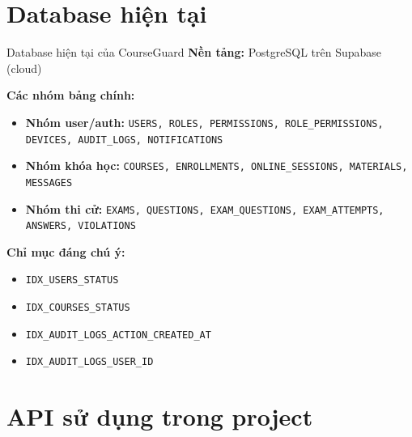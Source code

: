 \documentclass[aspectratio=169]{beamer}
\begin{document}
\section{Database hiện tại}

\begin{frame}{Database hiện tại của CourseGuard}
\textbf{Nền tảng:} PostgreSQL trên Supabase (cloud)

\vspace{0.5em}
\textbf{Các nhóm bảng chính:}
\begin{itemize}
  \item \textbf{Nhóm user/auth:} \texttt{USERS, ROLES, PERMISSIONS, ROLE\_PERMISSIONS, DEVICES, AUDIT\_LOGS, NOTIFICATIONS}
  \item \textbf{Nhóm khóa học:} \texttt{COURSES, ENROLLMENTS, ONLINE\_SESSIONS, MATERIALS, MESSAGES}
  \item \textbf{Nhóm thi cử:} \texttt{EXAMS, QUESTIONS, EXAM\_QUESTIONS, EXAM\_ATTEMPTS, ANSWERS, VIOLATIONS}
\end{itemize}

\vspace{0.5em}
\textbf{Chỉ mục đáng chú ý:}
\begin{itemize}
  \item \texttt{IDX\_USERS\_STATUS}
  \item \texttt{IDX\_COURSES\_STATUS}
  \item \texttt{IDX\_AUDIT\_LOGS\_ACTION\_CREATED\_AT}
  \item \texttt{IDX\_AUDIT\_LOGS\_USER\_ID}
\end{itemize}
\end{frame}

\section{API sử dụng trong project}
\end{document}
